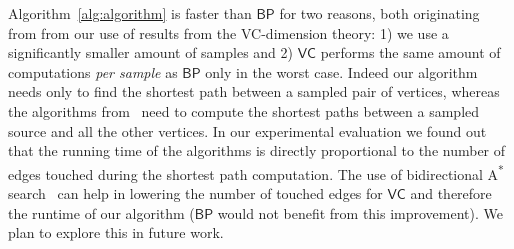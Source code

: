  Algorithm~\ref{alg:algorithm} is faster than $\mathsf{BP}$ for two reasons, both
originating from from our use of results from the VC-dimension theory: 1) we use
a significantly smaller amount of samples and 2) $\mathsf{VC}$ performs the
same amount of computations \emph{per sample} as $\mathsf{BP}$ only in the worst
case. Indeed our algorithm needs only to find the shortest path between a
sampled pair of vertices, whereas the algorithms
from~\citep{GeisbergerSS08,BrandesP07} need to compute the shortest paths
between a sampled source and all the other vertices. In our experimental
evaluation we found out that the running time of the algorithms is directly
proportional to the number of edges touched during the shortest path
computation. The use of bidirectional A\textsuperscript{*}
search~\citep{Pohl69,KaindlK97} can help in lowering the number of touched edges
for $\mathsf{VC}$ and therefore the runtime of our algorithm ($\mathsf{BP}$
would not benefit from this improvement). We plan to explore this in future
work.


